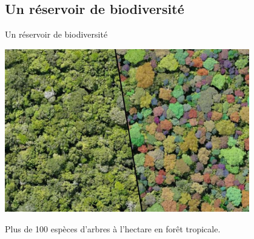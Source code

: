 \documentclass[10pt,table,dvipsnames,compress]{beamer}
\begin{document}
\subsection{Un réservoir de biodiversité}
\label{sec:orgb3057ba}

\begin{frame}[label={sec:orga6b6524}]{Un réservoir de biodiversité}
\begin{center}
\includegraphics[width=0.8\textwidth]{figs/vue-drone-foret-tropicale.jpg}
\end{center}

Plus de 100 espèces d'arbres à l'hectare en forêt tropicale.
\end{frame}
\end{document}
